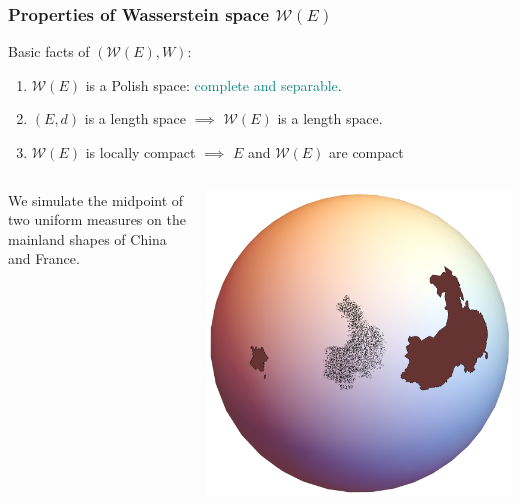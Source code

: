 \documentclass[aspectratio=169]{beamer}
\begin{document}
\begin{frame}
	\frametitle{Properties of Wasserstein space $\mathcal{W}(E)$}
	Basic facts of $(\mathcal{W}(E), W)$:
	\begin{enumerate}
		\item<1> $\mathcal{W}(E)$ is a Polish space: \textcolor{teal}{complete and separable}.
		\item $(E,d)$ is a length space $\implies$ $\mathcal{W}(E)$ is a length space.
		      \item<1> $\mathcal{W}(E)$ is locally compact $\implies$ $E$ and $\mathcal{W}(E)$ are compact
	\end{enumerate}
	\pause
	\begin{columns}
		\begin{example}
			We simulate the midpoint of two uniform measures on
			the mainland shapes of China and France.
		\end{example}
		\begin{center}
			\includegraphics[width=0.5\linewidth]{Chapters/OPT_sphere.pdf}
		\end{center}
	\end{columns}
\end{frame}
\end{document}
